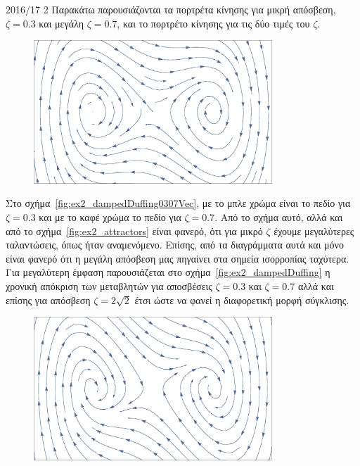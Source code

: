 \begin{solution}{2016/17 2}
    Παρακάτω παρουσιάζονται τα πορτρέτα κίνησης για μικρή απόσβεση,
    \( \zeta = 0.3 \) και μεγάλη \( \zeta = 0.7 \), και το πορτρέτο κίνησης
    για τις δύο τιμές του \( \zeta \).
    \begin{figure}[h]
        \centering
        \includegraphics[width=0.8\textwidth]{figures/ex2_dampedDuffing03Vec.eps}
        \caption{}
        \label{fig:ex2_dampedDuffing03Vec}
    \end{figure}
    Στο σχήμα~\ref{fig:ex2_dampedDuffing0307Vec}, με το μπλε χρώμα είναι το πεδίο
    για \( \zeta = 0.3 \) και με το καφέ χρώμα το πεδίο για
    \( \zeta = 0.7 \). Από το σχήμα αυτό, αλλά και από το
    σχήμα~\ref{fig:ex2_attractors} είναι φανερό, ότι για μικρό \( \zeta \)
    έχουμε μεγαλύτερες ταλαντώσεις, όπως ήταν αναμενόμενο. Επίσης, από τα διαγράμματα
    αυτά και μόνο είναι φανερό ότι η μεγάλη απόσβεση μας πηγαίνει στα σημεία ισορροπίας
    ταχύτερα. Για μεγαλύτερη έμφαση παρουσιάζεται στο
    σχήμα~\ref{fig:ex2_dampedDuffing} η χρονική απόκριση των μεταβλητών για
    αποσβέσεις \( \zeta = 0.3 \) και \( \zeta = 0.7 \) αλλά και επίσης για
    απόσβεση \( \zeta = 2\sqrt{2} \) έτσι ώστε να φανεί η διαφορετική μορφή σύγκλισης.
    \begin{figure}[h!]
        \centering
        \includegraphics[width=0.8\textwidth]{figures/ex2_dampedDuffing07Vec.eps}

\end{figure}
\end{solution}
